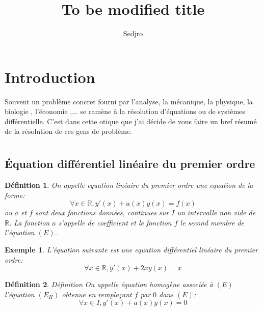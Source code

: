 \documentclass[12pt]{article}
\newtheorem{defi}{Définition}
\newtheorem{expl}{Exemple}
\begin{document}
\author{Sedjro}
\title{To be modified title}






\section{Introduction}
Souvent  un problème concret fourni par l'analyse, la mécanique, la physique, la biologie , l'économie ,... se ramène à la résolution d'équations ou de systèmes différentielle. C'est dans cette otique que j'ai décide de vous faire un bref résumé de la résolution de ces gens de problème. 
\section{}

\subsection{Équation différentiel linéaire du premier ordre}


\begin{defi}
On appelle equation linéaire du premier ordre une equation de la forme:
\begin{equation}
\forall x \in \mathbb{R}, y'(x)+a(x)y(x)=f(x)
\end{equation}
ou $a$ et $f$ sont deux fonctions données, continues sur $I$ un intervalle non vide de  $\mathbb{R}$.
La fonction $a$ s'appelle de coefficient et le fonction $f$ le second membre de l'équation $(E)$.
\end{defi}

\begin{expl}
L'équation suivante est une equation différentiel linéaire du premier ordre:
\begin{equation}
\forall x\in \mathbb{R}, y'(x)+2xy(x)=x
\end{equation}

\end{expl}

\begin{defi}Définition
On appelle équation homogène associée à $(E)$ l'équation $(E_{H})$ obtenue en remplaçant $f$ par $0$ dans $(E)$:
\begin{equation}
\forall x \in I, y'(x)+a(x)y(x)=0
\end{equation}
\end{defi}
\end{document}
